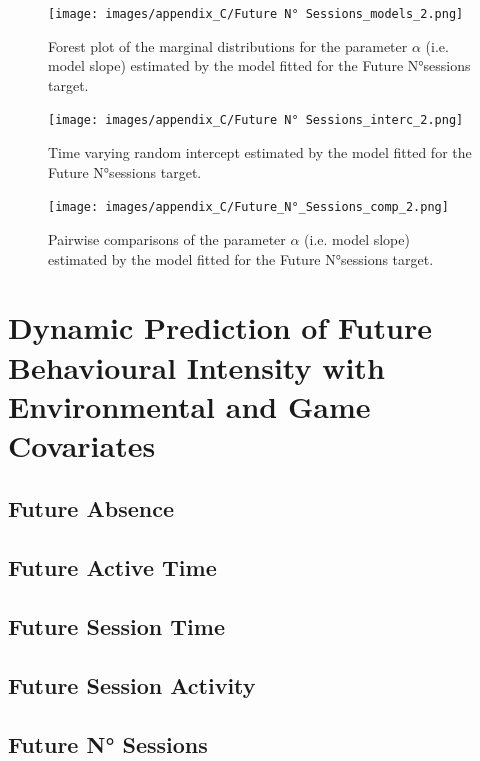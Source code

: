 \begin{figure}[H]
\centering
\texttt{[image: images/appendix\_C/Future N° Sessions\_models\_2.png]}
\caption[\textbf{Future N°sessions model fixed effect}]{Forest plot of the marginal distributions for the parameter $\alpha$ (i.e. model slope) estimated by the model fitted for the Future N°sessions target.}
\label{model_acti_2}
\end{figure}

\begin{figure}[H]
\centering
\texttt{[image: images/appendix\_C/Future N° Sessions\_interc\_2.png]}
\caption[\textbf{Future N°sessions time-varying random intercept}]{Time varying random intercept estimated by the model fitted for the Future N°sessions target.}
\label{interc_no_sess_2}
\end{figure}

\begin{figure}[H]
\centering
\texttt{[image: images/appendix\_C/Future\_N°\_Sessions\_comp\_2.png]}
\caption[\textbf{Future N°sessions pairwise comparisons of model fixed effect}]{Pairwise comparisons of the parameter $\alpha$ (i.e. model slope) estimated by the model fitted for the Future N°sessions target.}
\label{comp_no_sess_2}
\end{figure}

\section{Dynamic Prediction of Future Behavioural Intensity with Environmental and Game Covariates}
\label{dynamic_env_even_prediction_ancillary_perf}

\subsection{Future Absence}
\label{future_abs_bayes_2}

\subsection{Future Active Time}
\label{future_act_bayes_2}

\subsection{Future Session Time}
\label{future_sess_bayes_2}

\subsection{Future Session Activity}
\label{future_acti_bayes_2}

\subsection{Future N° Sessions}
\label{future_no_sess_bayes_2}
